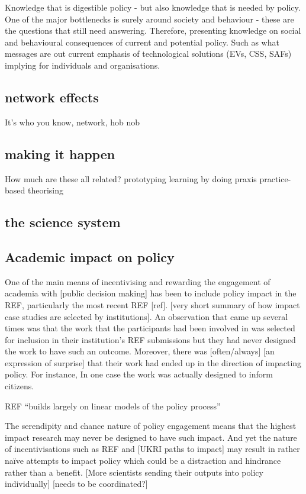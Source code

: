 Knowledge that is digestible policy - but also knowledge that is needed by policy. One of the major bottlenecks is surely around society and behaviour - these are the questions that still need answering. Therefore, presenting knowledge on social and behavioural consequences of current and potential policy. Such as what messages are out current emphasis of technological solutions (EVs, CSS, SAFs) implying for individuals and organisations.

\subsection{network effects}
It's who you know, network, hob nob

\subsection{making it happen}
How much are these all related?
prototyping
learning by doing
praxis
practice-based theorising

\subsection{the science system}

\subsection{Academic impact on policy}
One of the main means of incentivising and rewarding the engagement of academia with [public decision making] has been to include policy impact in the REF, particularly the most recent REF [ref]. [very short summary of how impact case studies are selected by institutions]. An observation that came up several times was that the work that the participants had been involved in was selected for inclusion in their institution's REF submissions but they had never designed the work to have such an outcome. Moreover, there was [often/always] [an expression of surprise] that their work had ended up in the direction of impacting policy. For instance, In one case the work was actually designed to inform citizens. 

REF ``builds largely on linear models of the policy process'' \cite{CairneyO2020}

The serendipity and chance nature of policy engagement means that the highest impact research may never be designed to have such impact. And yet the nature of incentivisations such as REF and [UKRI paths to impact] may result in rather na\"ive attempts to impact policy which could be a distraction and hindrance rather than a benefit. [More scientists sending their outputs into policy individually] [needs to be coordinated?]

